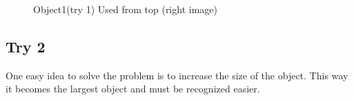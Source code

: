\begin{figure}
\caption{Object1(try 1) Used from top (right image)} 	
\end{figure}

\subsection{Try 2}
One easy idea to solve the problem is to increase the size of the object. This way it becomes the largest object and must be recognized easier.

